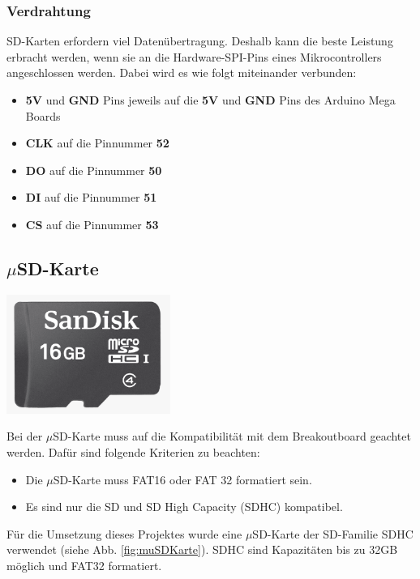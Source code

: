 \subsubsection*{Verdrahtung}
SD-Karten erfordern viel Datenübertragung. Deshalb kann die beste Leistung erbracht werden, wenn sie an die Hardware-SPI-Pins eines Mikrocontrollers angeschlossen werden. Dabei wird es wie folgt miteinander verbunden: \cite{ladyada2018}
\begin{itemize}
\item \textbf{5V} und \textbf{GND} Pins jeweils auf die \textbf{5V} und \textbf{GND} Pins des Arduino Mega Boards
\item \textbf{CLK} auf die Pinnummer \textbf{52}
\item \textbf{DO} auf die Pinnummer \textbf{50}
\item \textbf{DI} auf die Pinnummer \textbf{51}
\item \textbf{CS} auf die Pinnummer \textbf{53}
\end{itemize}
\newpage

\subsection{$\mu$SD-Karte}
\begin{minipage}{0.44\textwidth}
\centering
\includegraphics[width=0.4\textwidth]{graphics/Datenspeicherung/micro_sd_card_16GB.png}
\label{fig:muSDKarte}
\end{minipage}
\begin{minipage}{0.55\textwidth}
Bei der $\mu$SD-Karte muss auf die Kompatibilität mit dem Breakoutboard geachtet werden. Dafür sind folgende Kriterien zu beachten:\\
\begin{itemize}
\item Die $\mu$SD-Karte muss FAT16 oder FAT 32 formatiert sein.
\item Es sind nur die SD und SD High Capacity (SDHC) kompatibel.\\
\end{itemize}
\end{minipage}
Für die Umsetzung dieses Projektes wurde eine $\mu$SD-Karte der SD-Familie SDHC  verwendet (siehe Abb. \ref{fig:muSDKarte}). SDHC sind Kapazitäten bis zu 32GB möglich und FAT32 formatiert. \cite{muSDspez} 
\newpage

